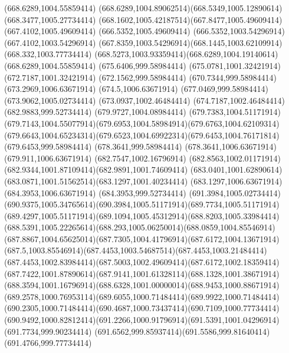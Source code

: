{{	\closepath
	\moveto(668.6289,1004.55859414)
	\curveto(668.6289,1004.89062514)(668.5349,1005.12890614)(668.3477,1005.27734414)
	\curveto(668.1602,1005.42187514)(667.8477,1005.49609414)(667.4102,1005.49609414)
	\lineto(666.5352,1005.49609414)
	\lineto(666.5352,1003.54296914)
	\lineto(667.4102,1003.54296914)
	\curveto(667.8359,1003.54296914)(668.1445,1003.62109914)(668.332,1003.77734414)
	\curveto(668.5273,1003.93359414)(668.6289,1004.19140614)(668.6289,1004.55859414)
	\closepath
	\moveto(675.6406,999.58984414)
	\lineto(675.0781,1001.32421914)
	\lineto(672.7187,1001.32421914)
	\lineto(672.1562,999.58984414)
	\lineto(670.7344,999.58984414)
	\lineto(673.2969,1006.63671914)
	\lineto(674.5,1006.63671914)
	\lineto(677.0469,999.58984414)
	\closepath
	\moveto(673.9062,1005.02734414)
	\lineto(673.0937,1002.46484414)
	\lineto(674.7187,1002.46484414)
	\closepath
	\moveto(682.9883,999.52734414)
	\lineto(679.9727,1004.08984414)
	\lineto(679.7383,1004.51171914)
	\curveto(679.7143,1004.55077914)(679.6953,1004.58984914)(679.6763,1004.62109314)
	\curveto(679.6643,1004.65234314)(679.6523,1004.69922314)(679.6453,1004.76171814)
	\lineto(679.6453,999.58984414)
	\lineto(678.3641,999.58984414)
	\lineto(678.3641,1006.63671914)
	\lineto(679.911,1006.63671914)
	\lineto(682.7547,1002.16796914)
	\curveto(682.8563,1002.01171914)(682.9344,1001.87109414)(682.9891,1001.74609414)
	\curveto(683.0401,1001.62890614)(683.0871,1001.51562514)(683.1297,1001.40234414)
	\lineto(683.1297,1006.63671914)
	\lineto(684.3953,1006.63671914)
	\lineto(684.3953,999.52734414)
	\closepath
	\moveto(691.3984,1005.02734414)
	\curveto(690.9375,1005.34765614)(690.3984,1005.51171914)(689.7734,1005.51171914)
	\curveto(689.4297,1005.51171914)(689.1094,1005.45312914)(688.8203,1005.33984414)
	\curveto(688.5391,1005.22265614)(688.293,1005.06250014)(688.0859,1004.85546914)
	\curveto(687.8867,1004.65625014)(687.7305,1004.41796914)(687.6172,1004.13671914)
	\curveto(687.5,1003.85546914)(687.4453,1003.54687514)(687.4453,1003.21484414)
	\curveto(687.4453,1002.83984414)(687.5003,1002.49609414)(687.6172,1002.18359414)
	\curveto(687.7422,1001.87890614)(687.9141,1001.61328114)(688.1328,1001.38671914)
	\curveto(688.3594,1001.16796914)(688.6328,1001.00000014)(688.9453,1000.88671914)
	\curveto(689.2578,1000.76953114)(689.6055,1000.71484414)(689.9922,1000.71484414)
	\curveto(690.2305,1000.71484414)(690.4687,1000.73437414)(690.7109,1000.77734414)
	\curveto(690.9492,1000.82812414)(691.2266,1000.91796914)(691.5391,1001.04296914)
	\lineto(691.7734,999.90234414)
	\curveto(691.6562,999.85937414)(691.5586,999.81640414)(691.4766,999.77734414)
}}

